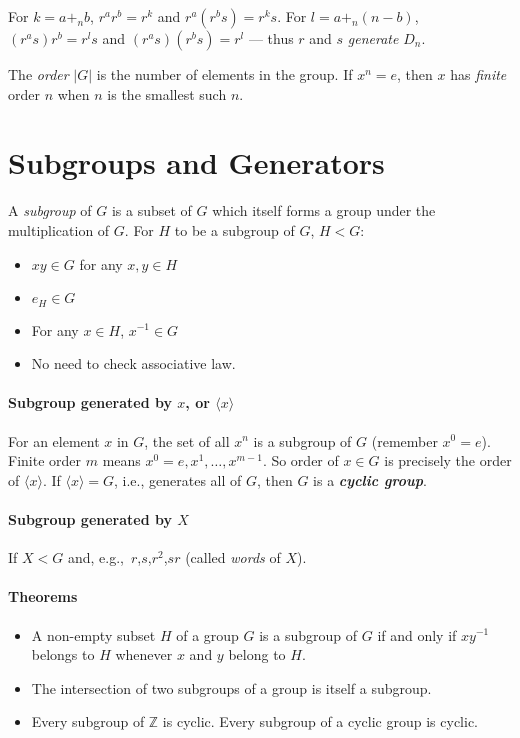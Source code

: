 \documentclass[a4paper,twocolumn,10pt]{article}
\begin{document}
  For $k=a+_nb$, $r^ar^b=r^k$ and $r^a(r^bs)=r^ks$.  For $l=a+_n(n-b)$,
  $(r^as)r^b=r^ls$ and $(r^as)(r^bs)=r^l$ --- thus $r$ and $s$
  \textit{generate} $D_n$.

  The \textit{order} $|G|$ is the number of elements in the group. If $x^n=e$,
  then $x$ has \textit{finite} order $n$ when $n$ is the smallest such $n$.

  \section{Subgroups and Generators}
  A \textit{subgroup} of $G$ is a subset of $G$ which itself forms a group
  under the multiplication of $G$. For $H$ to be a subgroup of $G$, $H<G$:
  \begin{itemize}
    \item $xy \in G$ for any $x,y \in H$
    \item $e_H \in G$
    \item For any $x \in H$, $x^{-1} \in G$
    \item No need to check associative law.
  \end{itemize}

  \paragraph{Subgroup generated by $x$, or $\langle x \rangle$}
  For an element $x$ in $G$, the set of all $x^n$ is a subgroup of $G$
  (remember $x^0=e$). Finite order $m$ means $x^0=e, x^1, \ldots, x^{m-1}$.
  So order of $x\in G$ is precisely the order of $\langle x\rangle$. If
  $\langle x\rangle=G$, i.e., generates all of $G$, then $G$ is a
  \textbf{\textit{cyclic group}}.

  \paragraph{Subgroup generated by $X$} If $X<G$ and, e.g.,~$r$,$s$,$r^2$,$sr$
  (called \textit{words} of $X$).

  \paragraph{Theorems}
  \begin{itemize}
    \item A non-empty subset $H$ of a group $G$ is a subgroup of $G$ if and
      only if $xy^{-1}$ belongs to $H$ whenever $x$ and $y$ belong to $H$.
    \item The intersection of two subgroups of a group is itself a subgroup.
    \item Every subgroup of $\mathbb{Z}$ is cyclic. Every subgroup of a cyclic
      group is cyclic.
  \end{itemize}
\end{document}
